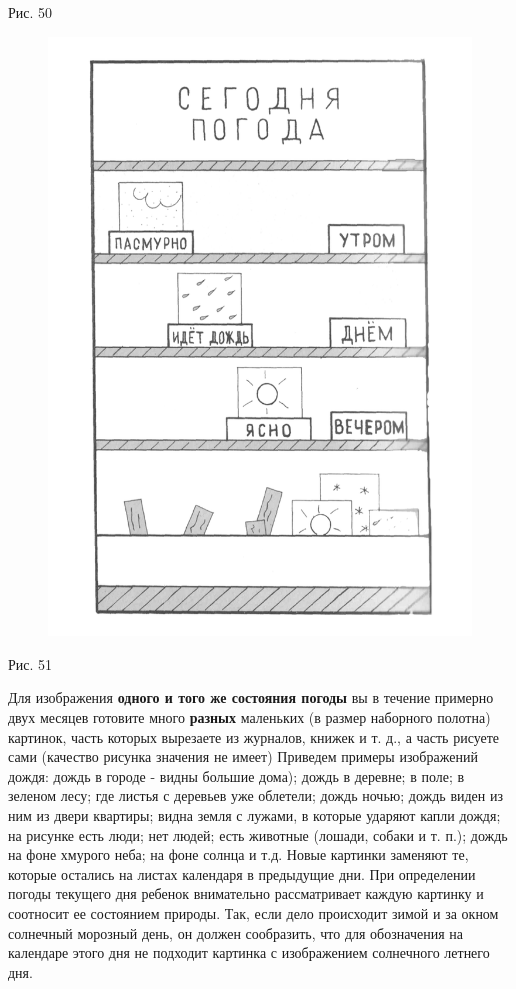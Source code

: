 \documentclass[a5paper]{book}
\begin{document}
Рис. 50

\begin{figure}
\centering
\includegraphics[width=\linewidth]{media/media/image47.png}
\end{figure}

Рис. 51

Для изображения \textbf{одного и того же состояния погоды} вы в течение
примерно двух месяцев готовите много \textbf{разных} маленьких (в размер
наборного полотна) картинок, часть которых вырезаете из журналов, книжек
и т. д., а часть рисуете сами (качество рисунка значения не имеет)
Приведем примеры изображений дождя: дождь в городе - видны большие
дома); дождь в деревне; в поле; в зеленом лесу; где листья с деревьев
уже облетели; дождь ночью; дождь виден из ним из двери квартиры; видна
земля с лужами, в которые ударяют капли дождя; на рисунке есть люди; нет
людей; есть животные (лошади, собаки и т. п.); дождь на фоне хмурого
неба; на фоне солнца и т.д. Новые картинки заменяют те, которые остались
на листах календаря в предыдущие дни. При определении погоды текущего
дня ребенок внимательно рассматривает каждую картинку и соотносит ее
состоянием природы. Так, если дело происходит зимой и за окном солнечный
морозный день, он должен сообразить, что для обозначения на календаре
этого дня не подходит картинка с изображением солнечного летнего дня.
\end{document}
